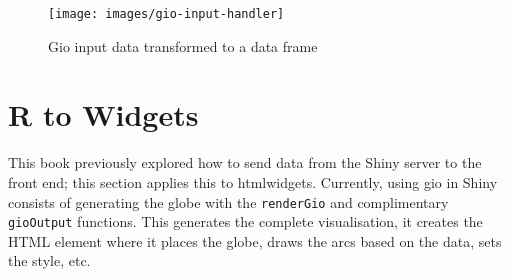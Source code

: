 \documentclass[10pt,]{krantz}
\makeatletter
\newenvironment{Shaded}{\begin{snugshade}}{\end{snugshade}}
\newcommand{\CommentTok}[1]{\textcolor[rgb]{0.37,0.37,0.37}{\textit{#1}}}
\newcommand{\ControlFlowTok}[1]{\textcolor[rgb]{0.27,0.27,0.27}{\textbf{#1}}}
\newcommand{\KeywordTok}[1]{\textcolor[rgb]{0.27,0.27,0.27}{\textbf{#1}}}
\newcommand{\NormalTok}[1]{#1}
\newcommand{\OperatorTok}[1]{\textcolor[rgb]{0.43,0.43,0.43}{\textbf{#1}}}
\newcommand{\StringTok}[1]{\textcolor[rgb]{0.5,0.5,0.5}{#1}}
\newenvironment{kframe}{%
\medskip{}
\setlength{\fboxsep}{.8em}
 \def\at@end@of@kframe{}%
 \ifinner\ifhmode%
  \def\at@end@of@kframe{\end{minipage}}%
  \begin{minipage}{\columnwidth}%
 \fi\fi%
 \def\FrameCommand##1{\hskip\@totalleftmargin \hskip-\fboxsep
 \colorbox{shadecolor}{##1}\hskip-\fboxsep
     \hskip-\linewidth \hskip-\@totalleftmargin \hskip\columnwidth}%
 \MakeFramed {\advance\hsize-\width
   \@totalleftmargin\z@ \linewidth\hsize
   \@setminipage}}%
 {\par\unskip\endMakeFramed%
 \at@end@of@kframe}
\renewenvironment{Shaded}{\begin{kframe}}{\end{kframe}}
\makeatother
\begin{document}
\begin{Shaded}
\end{Shaded}

\begin{figure}[H]

{\centering \texttt{[image: images/gio-input-handler]} 

}

\caption{Gio input data transformed to a data frame}\label{fig:gio-input-handler}
\end{figure}

\hypertarget{shiny-widgets-r-to-widgets}{%
\section{R to Widgets}\label{shiny-widgets-r-to-widgets}}

This book previously explored how to send data from the Shiny server to the front end; this section applies this to htmlwidgets. Currently, using gio in Shiny consists of generating the globe with the \texttt{renderGio} and complimentary \texttt{gioOutput} functions. This generates the complete visualisation, it creates the HTML element where it places the globe, draws the arcs based on the data, sets the style, etc.
\end{document}
